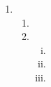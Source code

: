 \documentclass[a4paper]{scrartcl}
\begin{document}
\begin{enumerate}[label=\bfseries\arabic*.]
    \item
        \begin{enumerate}
            \item

            \item
                \begin{enumerate}[(i)]
                    \item

                    \item

                    \item

                \end{enumerate}

        \end{enumerate}

\end{enumerate}
\end{document}
